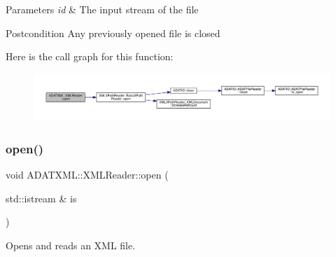 \begin{DoxyParams}{Parameters}
{\em id} & The input stream of the file \\
\hline
\end{DoxyParams}
\begin{DoxyPostcond}{Postcondition}
Any previously opened file is closed 
\end{DoxyPostcond}
Here is the call graph for this function\+:
\nopagebreak
\begin{figure}[H]
\begin{center}
\leavevmode
\includegraphics[width=350pt]{db/d3f/classADATXML_1_1XMLReader_a7938cc7e08b0381e467eb7b916cbbd97_cgraph}
\end{center}
\end{figure}
\mbox{\label{classADATXML_1_1XMLReader_a7938cc7e08b0381e467eb7b916cbbd97}} 
\subsubsection{\texorpdfstring{open()}{open()}\hspace{0.1cm}{\footnotesize\ttfamily [6/9]}}
{\footnotesize\ttfamily void A\+D\+A\+T\+X\+M\+L\+::\+X\+M\+L\+Reader\+::open (\begin{DoxyParamCaption}\item[{std\+::istream \&}]{is }\end{DoxyParamCaption})\hspace{0.3cm}{\ttfamily [inline]}}



Opens and reads an X\+ML file. 


